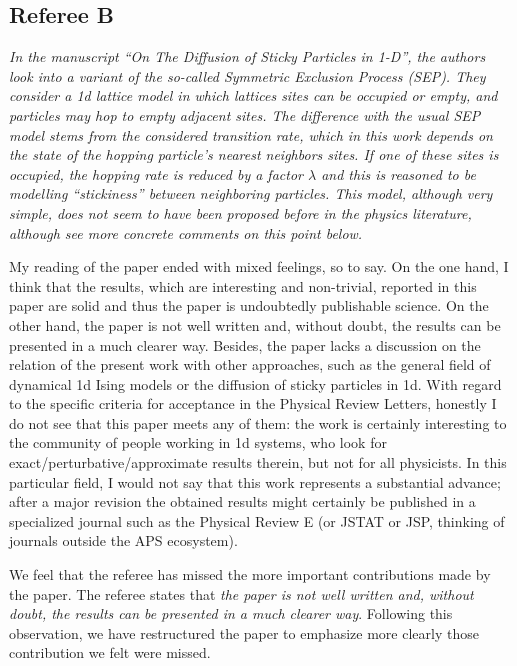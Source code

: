 \documentclass[a4paper,10pt]{article}
\begin{document}
\subsection*{Referee B}
{\it
   In the manuscript ``On The Diffusion of Sticky Particles in 1-D'', the
   authors look into a variant of the so-called Symmetric Exclusion
   Process (SEP). They consider a 1d lattice model in which lattices
   sites can be occupied or empty, and particles may hop to empty
   adjacent sites. The difference with the usual SEP model stems from the
   considered transition rate, which in this work depends on the state of
   the hopping particle's nearest neighbors sites. If one of these sites
   is occupied, the hopping rate is reduced by a factor $\lambda$ and
   this is reasoned to be modelling ``stickiness'' between neighboring
   particles. This model, although very simple, does not seem to have
   been proposed before in the physics literature, although see more
   concrete comments on this point below.
  
   My reading of the paper ended with mixed feelings, so to say. On the
   one hand, I think that the results, which are interesting and
   non-trivial, reported in this paper are solid and thus the paper is
   undoubtedly publishable science. On the other hand, the paper is not
   well written and, without doubt, the results can be presented in a
   much clearer way. Besides, the paper lacks a discussion on the
   relation of the present work with other approaches, such as the
   general field of dynamical 1d Ising models or the diffusion of sticky
   particles in 1d. With regard to the specific criteria for acceptance
   in the Physical Review Letters, honestly I do not see that this paper
   meets any of them: the work is certainly interesting to the community
   of people working in 1d systems, who look for
   exact/perturbative/approximate results therein, but not for all
   physicists. In this particular field, I would not say that this work
   represents a substantial advance; after a major revision the obtained
   results might certainly be published in a specialized journal such as
   the Physical Review E (or JSTAT or JSP, thinking of journals outside
   the APS ecosystem).
}

We feel that the referee has missed the more important contributions
made by the paper.  The referee states that {\it the paper is not well
  written and, without doubt, the results can be presented in a much
  clearer way}.  Following this observation, we have restructured the
paper to emphasize more clearly those contribution we felt were missed.
\end{document}
